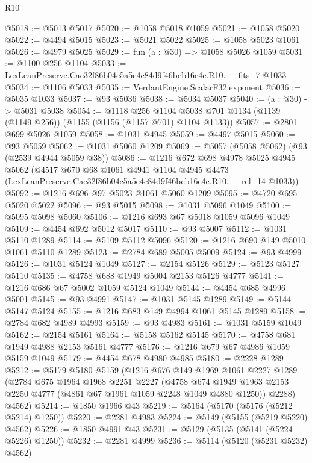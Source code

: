 \begin{lexlean}{R10}
\begin{coremodule}
@5018 := @5013 @5017
@5020 := @1058 @5018 @1059
@5021 := @1058 @5020
@5022 := @4494 @5015
@5023 := @5021 @5022
@5025 := @1058 @5023 @1061
@5026 := @4979 @5025
@5029 := fun (a : @30) => @1058 @5026 @1059
@5031 := @1100 @256 @1104
@5033 := LexLeanPreserve.Cac32f86b04c5a5e4c84d9f46beb16e4c.R10.__fits_7 @1033
@5034 := @1106 @5033
@5035 := VerdantEngine.ScalarF32.exponent
@5036 := @5035 @1033
@5037 := @93 @5036
@5038 := @5034 @5037
@5040 := (a : @30) -> @5031 @5038
@5054 := @1118
    @256
    @1104
    @5038
    @701
    @1134
    (@1139 (@1149 @256))
    (@1155 (@1156 (@1157 @701) @1104 @1133))
@5057 := @2801 @699 @5026 @1059
@5058 := @1031 @4945
@5059 := @4497 @5015
@5060 := @93 @5059
@5062 := @1031 @5060 @1209
@5069 := @5057 (@5058 @5062) (@93 (@2539 @4944 @5059 @38))
@5086 := @1216
    @672
    @698
    @4978
    @5025
    @4945
    @5062
    (@4517
      @670
      @68
      @1061
      @4941
      @1104
      @4945
      @4473
      (LexLeanPreserve.Cac32f86b04c5a5e4c84d9f46beb16e4c.R10.__rel_14 @1033))
@5092 := @1216 @696 @97 @5023 @1061 @5060 @1209
@5095 := @4720 @695 @5020 @5022
@5096 := @93 @5015
@5098 := @1031 @5096 @1049
@5100 := @5095 @5098 @5060
@5106 := @1216 @693 @67 @5018 @1059 @5096 @1049
@5109 := @4454 @692 @5012 @5017
@5110 := @93 @5007
@5112 := @1031 @5110 @1289
@5114 := @5109 @5112 @5096
@5120 := @1216 @690 @149 @5010 @1061 @5110 @1289
@5123 := @2784 @689 @5005 @5009
@5124 := @93 @4999
@5126 := @1031 @5124 @1049
@5127 := @2154 @5126
@5129 := @5123 @5127 @5110
@5135 := @4758 @688 @1949 @5004 @2153 @5126 @4777
@5141 := @1216 @686 @67 @5002 @1059 @5124 @1049
@5144 := @4454 @685 @4996 @5001
@5145 := @93 @4991
@5147 := @1031 @5145 @1289
@5149 := @5144 @5147 @5124
@5155 := @1216 @683 @149 @4994 @1061 @5145 @1289
@5158 := @2784 @682 @4989 @4993
@5159 := @93 @4983
@5161 := @1031 @5159 @1049
@5162 := @2154 @5161
@5164 := @5158 @5162 @5145
@5170 := @4758 @681 @1949 @4988 @2153 @5161 @4777
@5176 := @1216 @679 @67 @4986 @1059 @5159 @1049
@5179 := @4454 @678 @4980 @4985
@5180 := @2228 @1289
@5212 := @5179
    @5180
    @5159
    (@1216
      @676
      @149
      @1969
      @1061
      @2227
      @1289
      (@2784
        @675
        @1964
        @1968
        @2251
        @2227
        (@4758 @674 @1949 @1963 @2153 @2250 @4777 (@4861 @67 @1961 @1059 @2248 @1049 @4880 @1250))
        @2288)
      @4562)
@5214 := @1850 @1966 @43
@5219 := @5164 (@5170 (@5176 (@5212 @5214) @1250))
@5220 := @2281 @4983
@5224 := @5149 (@5155 (@5219 @5220) @4562)
@5226 := @1850 @4991 @43
@5231 := @5129 (@5135 (@5141 (@5224 @5226) @1250))
@5232 := @2281 @4999
@5236 := @5114 (@5120 (@5231 @5232) @4562)

\end{coremodule}
\end{lexlean}
